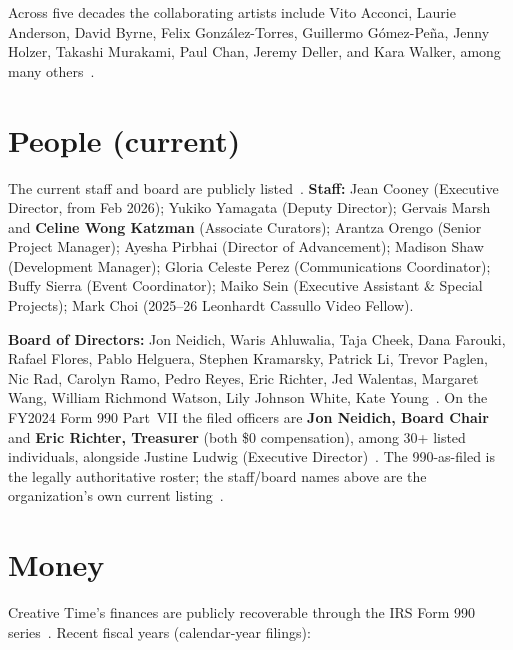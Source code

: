 \documentclass[10pt,letterpaper,twocolumn]{article}
\begin{document}
Across five decades the collaborating artists include Vito Acconci, Laurie Anderson, David Byrne, Felix Gonz\'{a}lez-Torres, Guillermo G\'{o}mez-Pe\~{n}a, Jenny Holzer, Takashi Murakami, Paul Chan, Jeremy Deller, and Kara Walker, among many others~\citep{ctfales,ctwiki}.

\section{People (current)}

The current staff and board are publicly listed~\citep{ctabout}. \textbf{Staff:} Jean Cooney (Executive Director, from Feb 2026); Yukiko Yamagata (Deputy Director); Gervais Marsh and \textbf{Celine Wong Katzman} (Associate Curators); Arantza Orengo (Senior Project Manager); Ayesha Pirbhai (Director of Advancement); Madison Shaw (Development Manager); Gloria Celeste Perez (Communications Coordinator); Buffy Sierra (Event Coordinator); Maiko Sein (Executive Assistant \& Special Projects); Mark Choi (2025--26 Leonhardt Cassullo Video Fellow).

\textbf{Board of Directors:} Jon Neidich, Waris Ahluwalia, Taja Cheek, Dana Farouki, Rafael Flores, Pablo Helguera, Stephen Kramarsky, Patrick Li, Trevor Paglen, Nic Rad, Carolyn Ramo, Pedro Reyes, Eric Richter, Jed Walentas, Margaret Wang, William Richmond Watson, Lily Johnson White, Kate Young~\citep{ctabout}. On the FY2024 Form 990 Part~VII the filed officers are \textbf{Jon Neidich, Board Chair} and \textbf{Eric Richter, Treasurer} (both \$0 compensation), among 30+ listed individuals, alongside Justine Ludwig (Executive Director)~\citep{ctpropublica}. The 990-as-filed is the legally authoritative roster; the staff/board names above are the organization's own current listing~\citep{ctabout}.

\section{Money}

Creative Time's finances are publicly recoverable through the IRS Form 990 series~\citep{ctpropublica}. Recent fiscal years (calendar-year filings):
\end{document}
